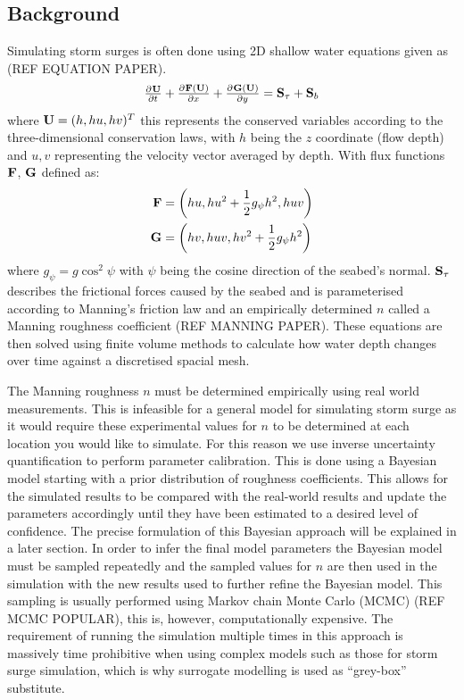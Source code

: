 \documentclass[12pt,a4paper]{article}
\begin{document}
\subsection{Background}
\noindent
Simulating storm surges is often done using 2D shallow water equations given as (REF EQUATION PAPER).
\begin{equation}
	\pd{{\bf U}}{t}+\pd{{\bf F(U)}}{x}+\pd{{\bf G(U)}}{y}={\bf S}_\tau+{\bf S}_b
\end{equation}
where ${\bf U}=(h,hu,hv)^T$ this represents the conserved variables according to the three-dimensional conservation laws, with $h$ being the $z$ coordinate (flow depth) and $u, v$ representing the velocity vector averaged by depth. With flux functions ${\bf F}$, ${\bf G}$ defined as:
\begin{align}
	{\bf F} &= \left( hu,hu^2+\frac{1}{2}g_\psi h^2,huv \right) \\
	{\bf G} &= \left( hv,huv,hv^2+\frac{1}{2}g_\psi h^2 \right)
\end{align}
where $g_\psi=g\cos^2\psi$ with $\psi$ being the cosine direction of the seabed's normal. ${\bf S}_\tau$ describes the frictional forces caused by the seabed and is parameterised according to Manning's friction law and an empirically determined $n$ called a Manning roughness coefficient (REF MANNING PAPER). These equations are then solved using finite volume methods to calculate how water depth changes over time against a discretised spacial mesh.

The Manning roughness $n$ must be determined empirically using real world measurements. This is infeasible for a general model for simulating storm surge as it would require these experimental values for $n$ to be determined at each location you would like to simulate. For this reason we use inverse uncertainty quantification to perform parameter calibration. This is done using a Bayesian model starting with a prior distribution of roughness coefficients. This allows for the simulated results to be compared with the real-world results and update the parameters accordingly until they have been estimated to a desired level of confidence. The precise formulation of this Bayesian approach will be explained in a later section. In order to infer the final model parameters the Bayesian model must be sampled repeatedly and the sampled values for $n$ are then used in the simulation with the new results used to further refine the Bayesian model. This sampling is usually performed using Markov chain Monte Carlo (MCMC) (REF MCMC POPULAR), this is, however, computationally expensive. The requirement of running the simulation multiple times in this approach is massively time prohibitive when using complex models such as those for storm surge simulation, which is why surrogate modelling is used as ``grey-box'' substitute.
\end{document}
